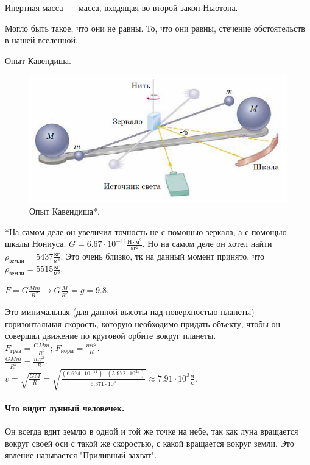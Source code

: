 \documentclass{article}
\begin{document}
	\begin{definition}
		Инертная масса~--- масса, входящая во второй закон Ньютона.
	\end{definition}
	\begin{statement}
		Могло быть такое, что они не равны. То, что они равны, стечение обстоятельств в нашей вселенной.
	\end{statement}
	\begin{definition}
		Опыт Кавендиша.
		\begin{figure}[H]
			\includegraphics[height=0.25\textwidth]{extra-materials/Опыт-Кавендиша}
			\caption{Опыт Кавендиша*.}
		\end{figure}
		*На самом деле он увеличил точность не с помощью зеркала, а с помощью шкалы Нониуса. $G = 6.67 \cdot 10^{-11} \frac{\text{Н} \cdot \text{м}^2}{\text{кг}^2}$. Но на самом деле он хотел найти $\rho_{\text{земли}} = 5437 \frac{\text{кг}}{\text{м}^3}$. Это очень близко, тк на данный момент принято, что $\rho_{\text{земли}} = 5515 \frac{\text{кг}}{\text{м}^3}$.
	\end{definition}
	\begin{definition}
		$F = G \frac{Mm}{R^2} \rightarrow G \frac{M}{R^2} = g = 9.8$.
	\end{definition}
	\begin{definition}
		Это минимальная (для данной высоты над поверхностью планеты) горизонтальная скорость, которую необходимо придать объекту, чтобы он совершал движение по круговой орбите вокруг планеты. \\
		$F_{\text{грав}} = \frac{GMm}{R^2}$; $F_{\text{норм}} = \frac{mv^2}{R}$. \\
		$\frac{GMm}{R^2} = \frac{mv^2}{R}$. \\
		$v = \sqrt{\frac{GM}{R}} = \sqrt{\frac{(6.674 \cdot 10^{-11}) \cdot (5.972 \cdot 10^{24})}{6.371 \cdot 10^6}} \approx 7.91 \cdot 10^3 \frac{\text{м}}{\text{с}}$.
	\end{definition}
	\paragraph{Что видит лунный человечек.} Он всегда вдит землю в одной и той же точке на небе, так как луна вращается вокруг своей оси с такой же скоростью, с какой вращается вокруг земли. Это явление называется "Приливный захват".
\end{document}
